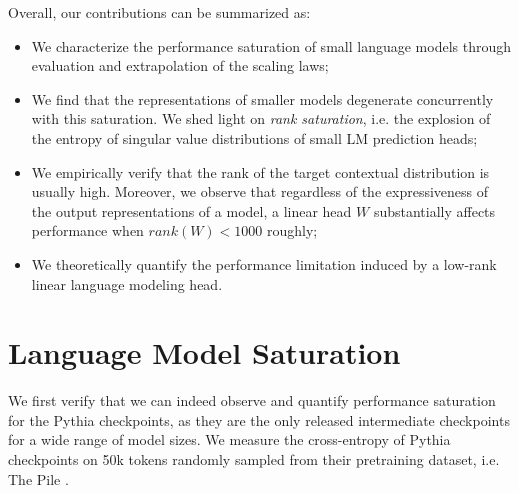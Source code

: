 Overall, our contributions can be summarized as:
\begin{itemize}
    \item We characterize the performance saturation of small language models through evaluation and extrapolation of the scaling laws;
    \item We find that the representations of smaller models degenerate concurrently with this saturation. We shed light on \textit{rank saturation}, i.e. the explosion of the entropy of singular value distributions of small LM prediction heads;
    \item We empirically verify that the rank of the target contextual distribution is usually
    high. Moreover, we observe that regardless of the expressiveness of the output
    representations of a model, a linear head $W$ substantially affects performance when
    $rank(W) < 1000$ roughly;
    \item We theoretically quantify the performance limitation induced by a low-rank linear language modeling head.
\end{itemize}


\section{Language Model Saturation}
We first verify that we can indeed observe and quantify performance saturation for the Pythia checkpoints, as they are the only released intermediate checkpoints for a wide range of model sizes. We measure the cross-entropy of Pythia checkpoints on 50k tokens randomly sampled from their pretraining dataset, i.e. The Pile \citep{gao2020pile}. 

